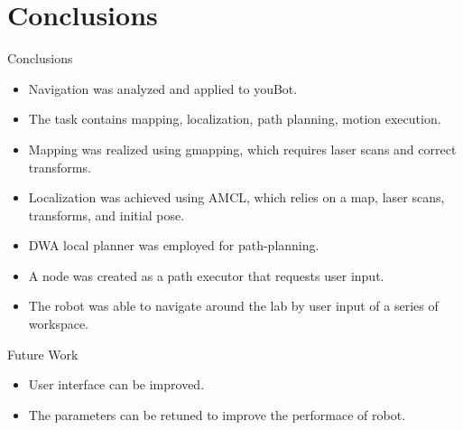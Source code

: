 
\section{Conclusions}
\begin{frame}{Conclusions}
\begin{itemize}
	\item Navigation was analyzed and applied to youBot.    
	\item The task contains mapping, localization, path planning, motion execution.
	\item Mapping was realized using gmapping, which requires laser scans and correct transforms.
	\item Localization was achieved using AMCL, which relies on a map, laser scans, transforms, and initial pose.
	\item DWA local planner was employed for path-planning.
	\item A node was created as a path executor that requests user input. 
	\item The robot was able to navigate around the lab by user input of a series of workspace.
\end{itemize}
\end{frame}
\begin{frame}{Future Work}
\begin{itemize}
	\item User interface can be improved.
	\item The parameters can be retuned to improve the performace of robot. 
\end{itemize}
\end{frame}